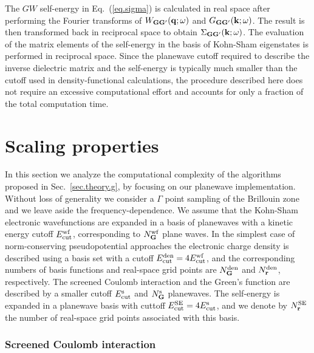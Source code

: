 \documentclass[twocolumn,prb,showpacs,superscriptaddress]{revtex4}
\def\w{\omega}
\def\q{{\bf q}}
\def\k{{\bf k}}
\def\G{{\bf G}}
\def\Gp{{\bf G^\prime}}
\def\r{{\bf r}}
\begin{document}
The $GW$ self-energy in Eq.\ (\ref{eq.sigma}) is calculated in real space
after performing the Fourier transforms of $W_{\G\Gp}(\q;\w)$ and $G_{\G\Gp}(\k;\w)$.
The result is then transformed back in reciprocal space to obtain
$\Sigma_{\G\Gp}(\k;\w)$. The evaluation of the matrix elements of the
self-energy in the basis of Kohn-Sham eigenstates is performed in reciprocal space.
Since the planewave cutoff required to describe the inverse dielectric
matrix and the self-energy is typically much smaller than the cutoff used
in density-functional calculations,\cite{hl86} the procedure described here 
does not require an excessive computational effort and accounts for only
a fraction of the total computation time.

\section{Scaling properties}\label{sec.scaling}

In this section we analyze the computational complexity of the algorithms
proposed in Sec.\ \ref{sec.theory.g}, by focusing on our planewave
implementation. Without loss of generality we consider a $\Gamma$ point sampling 
of the Brillouin zone and we leave aside the frequency-dependence.
We assume that the Kohn-Sham electronic wavefunctions are expanded in a basis of planewaves
with a kinetic energy cutoff $E_{\rm cut}^{\rm wf}$, corresponding to
$N_\G^{\rm wf}$ plane waves.
In the simplest case of norm-conserving pseudopotential approaches 
the electronic charge density is described using a basis set with a cutoff
$E_{\rm cut}^{\rm den}=4E_{\rm cut}^{\rm wf}$, and the corresponding numbers 
of basis functions and real-space grid points are $N_\G^{\rm den}$ and
$N_\r^{\rm den}$, respectively. The screened Coulomb interaction and the Green's function
are described by a smaller cutoff $E_{\rm cut}^{\rm s}$ and $N_\G^{\rm s}$
planewaves. The self-energy is expanded in a planewave basis with cuttoff
$E_{\rm cut}^{\rm SE}=4E_{\rm cut}^{\rm s}$, and we denote by $N_\r^{\rm SE}$
the number of real-space grid points associated with this basis.

\subsubsection{Screened Coulomb interaction}\label{sec.coulomb.scaling}
\end{document}
